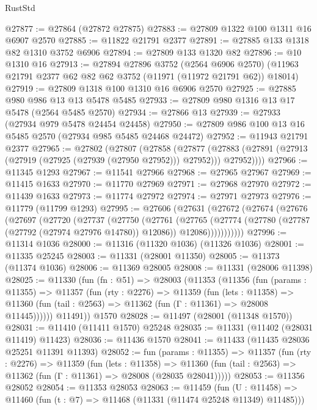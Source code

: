 \begin{lexlean}{RustStd}
\begin{coremodule}
@27877 := @27864 (@27872 @27875)
@27883 := @27809 @1322 @100 @1311 @16 @6907 @2570
@27885 := @11822 @21791 @2377
@27891 := @27885 @133 @1318 @82 @1310 @3752 @6906
@27894 := @27809 @133 @1320 @82
@27896 := @10 @1310 @16
@27913 := @27894
    @27896
    @3752
    (@2564 @6906 @2570)
    (@11963 @21791 @2377 @62 @82 @62 @3752 (@11971 (@11972 @21791 @62)) @18014)
@27919 := @27809 @1318 @100 @1310 @16 @6906 @2570
@27925 := @27885 @980 @986 @13 @13 @5478 @5485
@27933 := @27809 @980 @1316 @13 @17 @5478 (@2564 @5485 @2570)
@27934 := @27866 @13
@27939 := @27933 (@27934 @979 @5478 @24454 @24458)
@27950 := @27809 @986 @100 @13 @16 @5485 @2570 (@27934 @985 @5485 @24468 @24472)
@27952 := @11943 @21791 @2377
@27965 := @27802
    (@27807
      (@27858
        (@27877
          (@27883 (@27891 (@27913 (@27919 (@27925 (@27939 (@27950 @27952))) @27952))) @27952))))
@27966 := @11345 @1293
@27967 := @11541 @27966
@27968 := @27965 @27967
@27969 := @11415 @1633
@27970 := @11770 @27969
@27971 := @27968 @27970
@27972 := @11439 @1633
@27973 := @11774 @27972
@27974 := @27971 @27973
@27976 := @11779 (@11799 @1293)
@27995 := @27606
    (@27631
      (@27672
        (@27674
          (@27676
            (@27697
              (@27720
                (@27737
                  (@27750
                    (@27761
                      (@27765
                        (@27774
                          (@27780 (@27787 (@27792 (@27974 @27976 @14780)) @12086))
                          @12086)))))))))))
@27996 := @11314 @1036
@28000 := @11316 (@11320 @1036) (@11326 @1036)
@28001 := @11335 @25245
@28003 := @11331 (@28001 @11350)
@28005 := @11373 (@11374 @1036)
@28006 := @11369 @28005
@28008 := @11331 (@28006 @11398)
@28025 := @11330
    (fun (fn : @51) =>
    @28003
      (@11353
        (@11356
          (fun (params : @11355) =>
          @11357
            (fun (rty : @2276) =>
            @11359
              (fun (lets : @11358) =>
              @11360 (fun (tail : @2563) => @11362 (fun (Γ : @11361) => @28008 @11445))))))
        @11491))
    @1570
@28028 := @11497 (@28001 (@11348 @1570))
@28031 := @11410 (@11411 @1570) @25248
@28035 := @11331 (@11402 (@28031 @11419) @11423)
@28036 := @11436 @1570
@28041 := @11433 (@11435 @28036 @25251 @11391 @11393)
@28052 := fun (params : @11355) =>
  @11357
    (fun (rty : @2276) =>
    @11359
      (fun (lets : @11358) =>
      @11360 (fun (tail : @2563) => @11362 (fun (Γ : @11361) => @28008 (@28035 @28041)))))
@28053 := @11356 @28052
@28054 := @11353 @28053
@28063 := @11459
    (fun (U : @11458) => @11460 (fun (t : @7) => @11468 (@11331 (@11474 @25248 @11349) @11485)))

\end{coremodule}
\end{lexlean}
